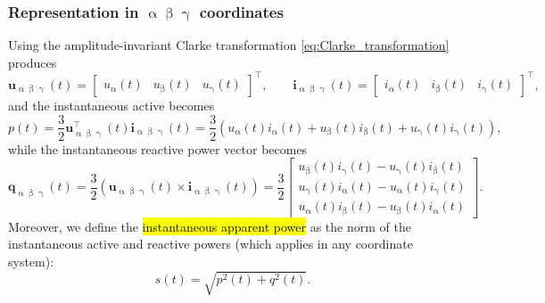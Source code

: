 \begin{frame}
    \frametitle{Representation in $\upalpha\upbeta\upgamma$ coordinates}
    Using the amplitude-invariant Clarke transformation \eqref{eq:Clarke_transformation} produces
    \begin{equation}
        \bm{u}_{\mathrm{\upalpha\upbeta\upgamma}}(t)=\begin{bmatrix} u_{\mathrm{\upalpha}}(t) & u_{\mathrm{\upbeta}}(t) & u_{\mathrm{\upgamma}}(t) \end{bmatrix}^\top,
        \qquad
        \bm{i}_{\mathrm{\upalpha\upbeta\upgamma}}(t)=\begin{bmatrix} i_{\mathrm{\upalpha}}(t) & i_{\mathrm{\upbeta}}(t) & i_{\mathrm{\upgamma}}(t) \end{bmatrix}^\top,
    \end{equation}\pause
    and the instantaneous active becomes
    \begin{equation}
        p(t)=\frac{3}{2}\bm{u}_{\upalpha\upbeta\upgamma}^{\top}(t)\bm{i}_{\upalpha\upbeta\upgamma}(t) = \frac{3}{2}\left(u_{\mathrm{\upalpha}}(t)i_{\mathrm{\upalpha}}(t) + u_{\mathrm{\upbeta}}(t)i_{\mathrm{\upbeta}}(t) + u_{\mathrm{\upgamma}}(t)i_{\mathrm{\upgamma}}(t)\right),
    \end{equation}\pause
    while the instantaneous reactive power vector becomes
    \begin{equation}
        \bm{q}_{\upalpha\upbeta\upgamma}(t)=\frac{3}{2}\left(\bm{u}_{\mathrm{\upalpha\upbeta\upgamma}}(t)\times\bm{i}_{\mathrm{\upalpha\upbeta\upgamma}}(t)\right)=\frac{3}{2}
        \begin{bmatrix}
            u_{\mathrm{\upbeta}}(t)i_{\mathrm{\upgamma}}(t)-u_{\mathrm{\upgamma}}(t)i_{\mathrm{\upbeta}}(t)   \\
            u_{\mathrm{\upgamma}}(t)i_{\mathrm{\upalpha}}(t)-u_{\mathrm{\upalpha}}(t)i_{\mathrm{\upgamma}}(t) \\
            u_{\mathrm{\upalpha}}(t)i_{\mathrm{\upbeta}}(t)-u_{\mathrm{\upbeta}}(t)i_{\mathrm{\upalpha}}(t)
        \end{bmatrix}.
    \end{equation}\pause
    Moreover, we define the \hl{instantaneous apparent power} as the norm of the instantaneous active and reactive powers (which applies in any coordinate system):
    \begin{equation}
        s(t)=\sqrt{p^2(t)+q^2(t)}.
    \end{equation}
\end{frame}

